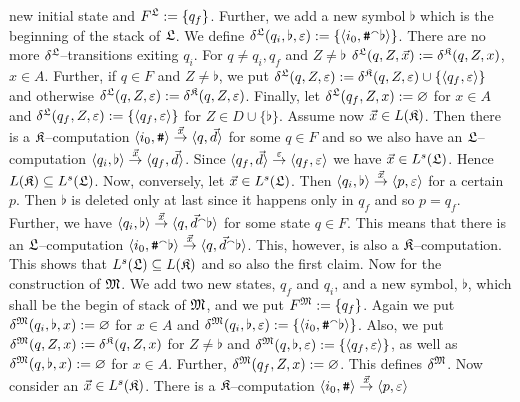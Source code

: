new initial state and $F^{\mathfrak{L}} := \{q_f\}$. Further, we add a
new symbol $\flat$ which is the beginning of the stack of
$\mathfrak{L}$. We define $\delta^{\mathfrak{L}}(q_i, \flat, \varepsilon) :=
\{\langle i_0, \mbox{\tt \#} {^{\smallfrown}} \flat\rangle\}$. There are no more
$\delta^{\mathfrak{L}}$--transitions exiting $q_i$.  For $q \neq q_i, q_f$ 
and $Z \neq \flat$ $\delta^{\mathfrak{L}}(q,Z,\vec{x}) := \delta^{\mathfrak{K}}(q,Z,x)$, 
$x \in A$.  Further, if $q \in F$ and $Z \neq \flat$, we put
$\delta^{\mathfrak{L}}(q, Z, \varepsilon) := 
\delta^{\mathfrak{K}}(q,Z, \varepsilon) \cup \{\langle q_f, \varepsilon\rangle\}$ 
and otherwise $\delta^{\mathfrak{L}}(q, Z, \varepsilon) := 
\delta^{\mathfrak{K}}(q, Z, \varepsilon)$. Finally, let
$\delta^{\mathfrak{L}}(q_f, Z, x) := \varnothing$ for
$x \in A$ and $\delta^{\mathfrak{L}}(q_f, Z, \varepsilon) :=
\{\langle q_f, \varepsilon\rangle\}$ for $Z \in D \cup \{\flat\}$.
Assume now $\vec{x} \in L(\mathfrak{K})$. Then there is a $\mathfrak{K}$--computation
$\auf i_0, \mbox{\tt \#}\zu \stackrel{\vec{x}}{\pf} %
\auf q, \vec{d}\zu$ for some $q \in F$ and so we also have an 
$\mathfrak{L}$--computation 
$\langle q_i, \flat\rangle \stackrel{\vec{x}}{\rightarrow} \langle q_f,\vec{d}\rangle$. 
Since $\langle q_f, \vec{d}\rangle \stackrel{\varepsilon}{\rightarrow}
\langle q_f, \varepsilon\rangle$ we have $\vec{x} \in L^s(\mathfrak{L})$.
Hence $L(\mathfrak{K}) \subseteq L^s(\mathfrak{L})$. Now, conversely, let
$\vec{x} \in L^s(\mathfrak{L})$. Then $\langle q_i, \flat\rangle \stackrel{\vec{x}}{\rightarrow}
\langle p, \varepsilon\rangle$ for a certain $p$. Then
$\flat$ is deleted only at last since it happens only in
$q_f$ and so $p = q_f$. Further, we have
$\langle q_i, \flat\rangle \stackrel{\vec{x}}{\rightarrow} \langle q,
\vec{d}{^{\smallfrown}} \flat\rangle$ for some state $q \in F$.
This means that there is an $\mathfrak{L}$--com\-pu\-ta\-tion
$\langle i_0, \mbox{\tt \#} {^{\smallfrown}} \flat\rangle
\stackrel{\vec{x}}{\rightarrow} \langle q, \vec{d} {^{\smallfrown}} \flat\rangle$.
This, however, is also a $\mathfrak{K}$--computation.
This shows that $L^s(\mathfrak{L}) \subseteq L(\mathfrak{K})$ and so also the
first claim. Now for the construction of $\mathfrak{M}$. We add two
new states, $q_f$ and $q_i$, and a new symbol, $\flat$,
which shall be the begin of stack of $\mathfrak{M}$, and we put
$F^{\mathfrak{M}} := \{q_f\}$. Again we put $\delta^{\GM}(q_i, \flat, x) %
:= \varnothing$ for $x \in A$ and $\delta^{\GM}(q_i, \flat, \varepsilon) %
:= \{\auf i_0, \mbox{\tt \#} \conc \flat\zu\}$.
Also, we put $\delta^{\mathfrak{M}}(q, Z, x) := \delta^{\mathfrak{K}}(q,Z,x)$
for $Z \neq \flat$ and $\delta^{\mathfrak{M}}(q, \flat, \varepsilon) :=
\{\langle q_f, \varepsilon\rangle\}$, as well as
$\delta^{\mathfrak{M}}(q, \flat, x) := \varnothing$ for $x \in A$.
Further, $\delta^{\mathfrak{M}}(q_f, Z, x) := \varnothing$.
This defines $\delta^{\mathfrak{M}}$. Now consider an
$\vec{x} \in L^s(\mathfrak{K})$. There is a $\mathfrak{K}$--computation
$\langle i_0, \mbox{\tt \#}\rangle \stackrel{\vec{x}}{\rightarrow} \langle p, \varepsilon\rangle$
